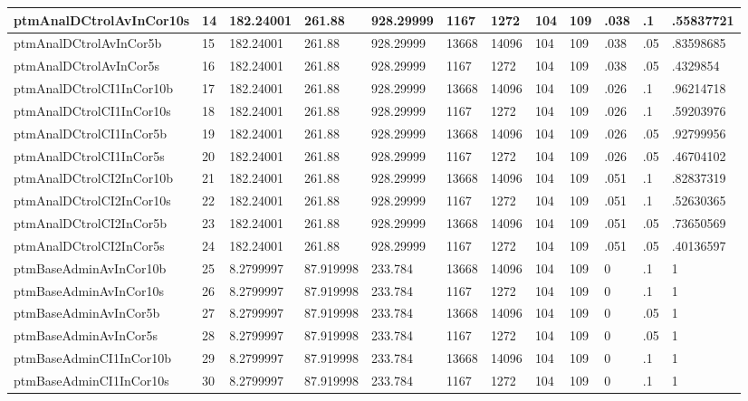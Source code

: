 \begin{tabular}{|l|l|l|l|l|l|l|l|l|l|l|l|}
ptmAnalDCtrolAvInCor10s & 14 & 182.24001 & 261.88 & 928.29999 & 1167 & 1272 & 104 & 109 & .038 & .1 & .55837721 \\ \hline 
ptmAnalDCtrolAvInCor5b & 15 & 182.24001 & 261.88 & 928.29999 & 13668 & 14096 & 104 & 109 & .038 & .05 & .83598685 \\ \hline 
ptmAnalDCtrolAvInCor5s & 16 & 182.24001 & 261.88 & 928.29999 & 1167 & 1272 & 104 & 109 & .038 & .05 & .4329854 \\ \hline 
ptmAnalDCtrolCI1InCor10b & 17 & 182.24001 & 261.88 & 928.29999 & 13668 & 14096 & 104 & 109 & .026 & .1 & .96214718 \\ \hline 
ptmAnalDCtrolCI1InCor10s & 18 & 182.24001 & 261.88 & 928.29999 & 1167 & 1272 & 104 & 109 & .026 & .1 & .59203976 \\ \hline 
ptmAnalDCtrolCI1InCor5b & 19 & 182.24001 & 261.88 & 928.29999 & 13668 & 14096 & 104 & 109 & .026 & .05 & .92799956 \\ \hline 
ptmAnalDCtrolCI1InCor5s & 20 & 182.24001 & 261.88 & 928.29999 & 1167 & 1272 & 104 & 109 & .026 & .05 & .46704102 \\ \hline 
ptmAnalDCtrolCI2InCor10b & 21 & 182.24001 & 261.88 & 928.29999 & 13668 & 14096 & 104 & 109 & .051 & .1 & .82837319 \\ \hline 
ptmAnalDCtrolCI2InCor10s & 22 & 182.24001 & 261.88 & 928.29999 & 1167 & 1272 & 104 & 109 & .051 & .1 & .52630365 \\ \hline 
ptmAnalDCtrolCI2InCor5b & 23 & 182.24001 & 261.88 & 928.29999 & 13668 & 14096 & 104 & 109 & .051 & .05 & .73650569 \\ \hline 
ptmAnalDCtrolCI2InCor5s & 24 & 182.24001 & 261.88 & 928.29999 & 1167 & 1272 & 104 & 109 & .051 & .05 & .40136597 \\ \hline 
ptmBaseAdminAvInCor10b & 25 & 8.2799997 & 87.919998 & 233.784 & 13668 & 14096 & 104 & 109 & 0 & .1 & 1 \\ \hline 
ptmBaseAdminAvInCor10s & 26 & 8.2799997 & 87.919998 & 233.784 & 1167 & 1272 & 104 & 109 & 0 & .1 & 1 \\ \hline 
ptmBaseAdminAvInCor5b & 27 & 8.2799997 & 87.919998 & 233.784 & 13668 & 14096 & 104 & 109 & 0 & .05 & 1 \\ \hline 
ptmBaseAdminAvInCor5s & 28 & 8.2799997 & 87.919998 & 233.784 & 1167 & 1272 & 104 & 109 & 0 & .05 & 1 \\ \hline 
ptmBaseAdminCI1InCor10b & 29 & 8.2799997 & 87.919998 & 233.784 & 13668 & 14096 & 104 & 109 & 0 & .1 & 1 \\ \hline 
ptmBaseAdminCI1InCor10s & 30 & 8.2799997 & 87.919998 & 233.784 & 1167 & 1272 & 104 & 109 & 0 & .1 & 1 \\ \hline 

\end{tabular}
